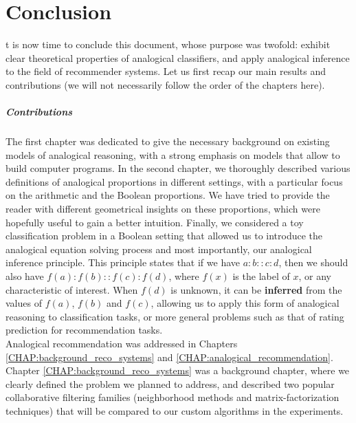 \chapter*{Conclusion}

t is now time to conclude this document, whose purpose was twofold:
exhibit clear theoretical properties of analogical classifiers, and apply
analogical inference to the field of recommender systems. Let us first recap
our main results and contributions (we will not necessarily follow the order of
the chapters here).

\paragraph{Contributions\\}

The first chapter was dedicated to give the necessary background on existing
models of analogical reasoning,  with a strong emphasis on models that allow
to build computer programs. In the second chapter, we thoroughly described
various definitions of analogical proportions in different settings, with a
particular focus on the arithmetic and the Boolean proportions. We have tried to
provide the reader with different geometrical insights on these proportions,
which were hopefully useful to gain a better intuition.
Finally, we considered a toy classification problem in a Boolean setting that
allowed us to introduce the analogical equation solving process and most
importantly, our analogical inference principle. This principle states that if
we have $a:b::c:d$, then we should also have $f(a) : f(b) :: f(c):f(d)$, where
$f(x)$ is the label of $x$, or any characteristic of interest.  When $f(d)$ is
unknown, it can be \textbf{inferred} from the values of $f(a)$, $f(b)$ and
$f(c)$, allowing us to apply this form of analogical reasoning to
classification tasks, or more general problems such as that of rating
prediction for recommendation tasks.\\

Analogical recommendation was addressed in Chapters
\ref{CHAP:background_reco_systems} and \ref{CHAP:analogical_recommendation}.
Chapter \ref{CHAP:background_reco_systems} was a background chapter, where we
clearly defined the problem we planned to address, and described two popular
collaborative filtering families (neighborhood methods and
matrix-factorization techniques) that will be compared to our custom algorithms
in the experiments.

